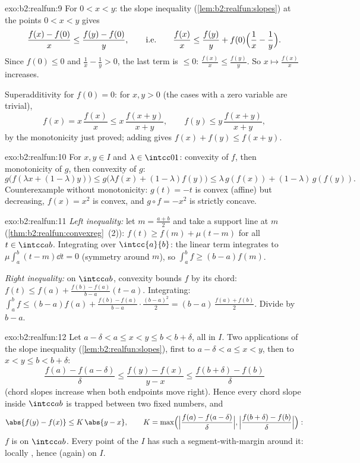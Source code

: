 \begin{solution}{exo:b2:realfun:9}
For $0 < x < y$: the slope inequality
(\cref{lem:b2:realfun:slopes}) at the points $0 < x < y$ gives
\[
\frac{f(x) - f(0)}{x} \leq \frac{f(y) - f(0)}{y},
\qquad\text{i.e.}\qquad
\frac{f(x)}{x} \leq \frac{f(y)}{y} +
f(0)\Bigl(\frac1x - \frac1y\Bigr).
\]
Since $f(0) \leq 0$ and $\frac1x - \frac1y > 0$, the last term is
$\leq 0$: $\frac{f(x)}{x} \leq \frac{f(y)}{y}$. So $x \mapsto
\frac{f(x)}x$ increases.

Superadditivity for $f(0) = 0$: for $x, y > 0$ (the cases with a
zero variable are trivial),
\[
f(x) = x\,\frac{f(x)}{x} \leq x\,\frac{f(x+y)}{x+y},
\qquad
f(y) \leq y\,\frac{f(x+y)}{x+y},
\]
by the monotonicity just proved; adding gives $f(x) + f(y) \leq
f(x+y)$.
\end{solution}

\begin{solution}{exo:b2:realfun:10}
For $x, y \in I$ and $\lambda \in \intcc01$: convexity of $f$,
then monotonicity of $g$, then convexity of $g$:
\[
g\bigl(f(\lambda x + (1{-}\lambda)y)\bigr)
\leq g\bigl(\lambda f(x) + (1{-}\lambda)f(y)\bigr)
\leq \lambda\,g(f(x)) + (1{-}\lambda)\,g(f(y)).
\]
Counterexample without monotonicity: $g(t) = -t$ is convex
(affine) but decreasing, $f(x) = x^2$ is convex, and $g \circ f =
-x^2$ is strictly concave.
\end{solution}

\begin{solution}{exo:b2:realfun:11}
\emph{Left inequality:} let $m = \frac{a+b}2$ and take a support
line at $m$ (\cref{thm:b2:realfun:convexreg}~(2)): $f(t) \geq
f(m) + \mu(t - m)$ for all $t \in \intcc ab$. Integrating over
$\intcc{a}{b}$: the linear term integrates to $\mu\int_a^b(t -
m)\dd t = 0$ (symmetry around $m$), so $\int_a^b f \geq (b -
a)f(m)$.

\emph{Right inequality:} on $\intcc ab$, convexity bounds $f$ by
its chord: $f(t) \leq f(a) + \frac{f(b) - f(a)}{b - a}(t - a)$.
Integrating: $\int_a^b f \leq (b-a)f(a) + \frac{f(b) - f(a)}{b -
a}\cdot\frac{(b-a)^2}2 = (b - a)\,\frac{f(a) + f(b)}2$. Divide by
$b - a$.
\end{solution}

\begin{solution}{exo:b2:realfun:12}
Let $a - \delta < a \leq x < y \leq b < b + \delta$, all in $I$.
Two applications of the slope inequality
(\cref{lem:b2:realfun:slopes}), first to $a - \delta < a \leq x <
y$, then to $x < y \leq b < b + \delta$:
\[
\frac{f(a) - f(a - \delta)}{\delta}
\leq \frac{f(y) - f(x)}{y - x}
\leq \frac{f(b + \delta) - f(b)}{\delta}
\]
(chord slopes increase when both endpoints move right). Hence
every chord slope inside $\intcc ab$ is trapped between two fixed
numbers, and
\[
\abs{f(y) - f(x)} \leq K\,\abs{y - x},
\qquad
K = \max\Bigl(\Bigl|\frac{f(a) - f(a-\delta)}{\delta}\Bigr|,
\Bigl|\frac{f(b+\delta) - f(b)}{\delta}\Bigr|\Bigr):
\]
$f$ is  on $\intcc ab$. Every point of the  $I$ has
such a segment-with-margin around it: locally , hence
(again)  on $I$.
\end{solution}

